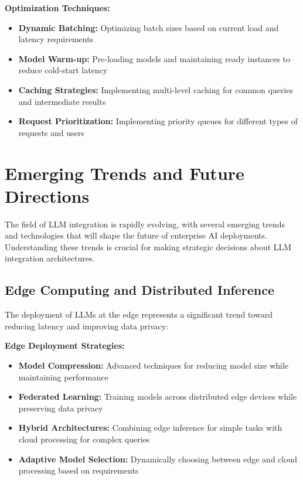 \textbf{Optimization Techniques:}
\begin{itemize}
    \item \textbf{Dynamic Batching:} Optimizing batch sizes based on current load and latency requirements
    \item \textbf{Model Warm-up:} Pre-loading models and maintaining ready instances to reduce cold-start latency
    \item \textbf{Caching Strategies:} Implementing multi-level caching for common queries and intermediate results
    \item \textbf{Request Prioritization:} Implementing priority queues for different types of requests and users
\end{itemize}


\section{Emerging Trends and Future Directions}

The field of LLM integration is rapidly evolving, with several emerging trends and technologies that will shape the future of enterprise AI deployments. Understanding these trends is crucial for making strategic decisions about LLM integration architectures.

\subsection{Edge Computing and Distributed Inference}

The deployment of LLMs at the edge represents a significant trend toward reducing latency and improving data privacy:

\textbf{Edge Deployment Strategies:}
\begin{itemize}
    \item \textbf{Model Compression:} Advanced techniques for reducing model size while maintaining performance
    \item \textbf{Federated Learning:} Training models across distributed edge devices while preserving data privacy
    \item \textbf{Hybrid Architectures:} Combining edge inference for simple tasks with cloud processing for complex queries
    \item \textbf{Adaptive Model Selection:} Dynamically choosing between edge and cloud processing based on requirements
\end{itemize}

